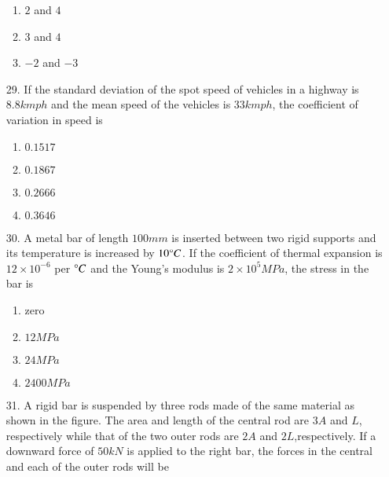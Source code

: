 \documentclass[journal,12pt,onecolumn]{IEEEtran}
\theoremstyle{remark}
\begin{document}
\begin{enumerate}
\begin{enumerate}
                \item $2$ and $4$
                \item $3$ and $4$
                \item $-2$ and $-3$
        \end{enumerate}
\item[29.] If the standard deviation of the spot speed of vehicles in a highway is $8.8 kmph$ and the mean speed of the vehicles is $33 kmph$, the coefficient of variation in speed is 
	\begin{enumerate}
                \item $0.1517$
                \item $0.1867$
                \item $0.2666$
                \item $0.3646$
        \end{enumerate}
\item[30.] A metal bar of length $100 mm$ is inserted between two rigid supports and its temperature is increased by $10{\degree}C$. If the coefficient of thermal expansion is $12 \times 10^{-6}$ per ${\degree}C$ and the Young's modulus is $2 \times 10^5 MPa$, the stress in the bar is 
	\begin{enumerate}
                \item zero
                \item $12 MPa$
                \item $24 MPa$
                \item $2400 MPa$
        \end{enumerate}
\item[31.] A rigid bar is suspended by three rods made of the same material as shown in the figure. The area and length of the central rod are $3A$ and $L$, respectively while that of the two outer rods are $2A$ and $2L$,respectively. If a downward force of $50 kN$ is applied to the right bar, the forces in the central and each of the outer rods will be\\
	\begin{center}	
\end{center}
\end{enumerate}
\end{document}
